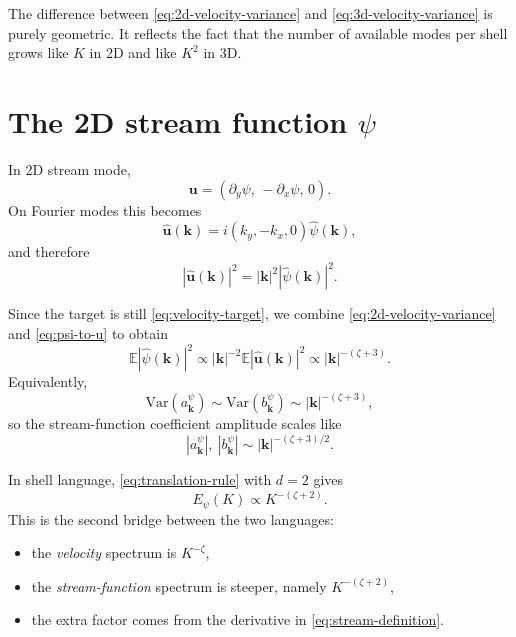 \documentclass[11pt]{article}
\newcommand{\E}{\mathbb{E}}
\newcommand{\Var}{\mathrm{Var}}
\newcommand{\kk}{\mathbf{k}}
\newcommand{\uu}{\mathbf{u}}
\begin{document}
The difference between \eqref{eq:2d-velocity-variance} and \eqref{eq:3d-velocity-variance} is purely geometric. It reflects the fact that the number of available modes per shell grows like $K$ in 2D and like $K^2$ in 3D.

\section{The 2D stream function \texorpdfstring{$\psi$}{psi}}
In 2D stream mode,
\begin{equation}
\uu = (\partial_y\psi,\,-\partial_x\psi,\,0).
\label{eq:stream-definition}
\end{equation}
On Fourier modes this becomes
\begin{equation}
\hat{\uu}(\kk)=i(k_y,-k_x,0)\hat{\psi}(\kk),
\end{equation}
and therefore
\begin{equation}
|\hat{\uu}(\kk)|^2 = |\kk|^2 |\hat{\psi}(\kk)|^2.
\label{eq:psi-to-u}
\end{equation}

Since the target is still \eqref{eq:velocity-target}, we combine
\eqref{eq:2d-velocity-variance} and \eqref{eq:psi-to-u} to obtain
\begin{equation}
\E |\hat{\psi}(\kk)|^2
\propto |\kk|^{-2}\E |\hat{\uu}(\kk)|^2
\propto |\kk|^{-(\zeta+3)}.
\label{eq:psi-variance}
\end{equation}
Equivalently,
\begin{equation}
\Var(a_{\kk}^{\psi})\sim \Var(b_{\kk}^{\psi})\sim |\kk|^{-(\zeta+3)},
\end{equation}
so the stream-function coefficient amplitude scales like
\begin{equation}
|a_{\kk}^{\psi}|,\ |b_{\kk}^{\psi}| \sim |\kk|^{-(\zeta+3)/2}.
\end{equation}

In shell language, \eqref{eq:translation-rule} with $d=2$ gives
\begin{equation}
E_{\psi}(K)\propto K^{-(\zeta+2)}.
\end{equation}
This is the second bridge between the two languages:
\begin{itemize}
\item the \emph{velocity} spectrum is $K^{-\zeta}$,
\item the \emph{stream-function} spectrum is steeper, namely $K^{-(\zeta+2)}$,
\item the extra factor comes from the derivative in \eqref{eq:stream-definition}.
\end{itemize}
\end{document}
